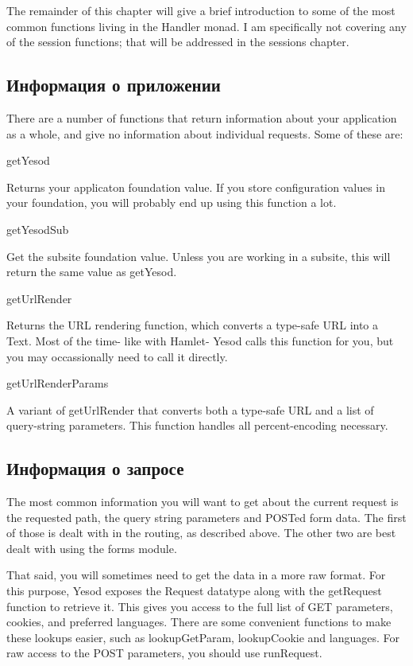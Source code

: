 The remainder of this chapter will give a brief introduction to some
of the most common functions living in the Handler monad. I am
specifically not covering any of the session functions; that will be
addressed in the sessions chapter.

\subsection{Информация о приложении}

There are a number of functions that return information about your
application as a whole, and give no information about individual
requests. Some of these are:

getYesod

Returns your applicaton foundation value. If you store configuration
values in your foundation, you will probably end up using this
function a lot.

getYesodSub

Get the subsite foundation value. Unless you are working in a subsite,
this will return the same value as getYesod.

getUrlRender

Returns the URL rendering function, which converts a type-safe URL
into a Text. Most of the time- like with Hamlet- Yesod calls this
function for you, but you may occassionally need to call it directly.

getUrlRenderParams

A variant of getUrlRender that converts both a type-safe URL and a
list of query-string parameters. This function handles all
percent-encoding necessary.

\subsection{Информация о запросе}

The most common information you will want to get about the current
request is the requested path, the query string parameters and POSTed
form data. The first of those is dealt with in the routing, as
described above. The other two are best dealt with using the forms
module.

That said, you will sometimes need to get the data in a more raw
format. For this purpose, Yesod exposes the Request datatype along
with the getRequest function to retrieve it. This gives you access to
the full list of GET parameters, cookies, and preferred
languages. There are some convenient functions to make these lookups
easier, such as lookupGetParam, lookupCookie and languages. For raw
access to the POST parameters, you should use runRequest.

